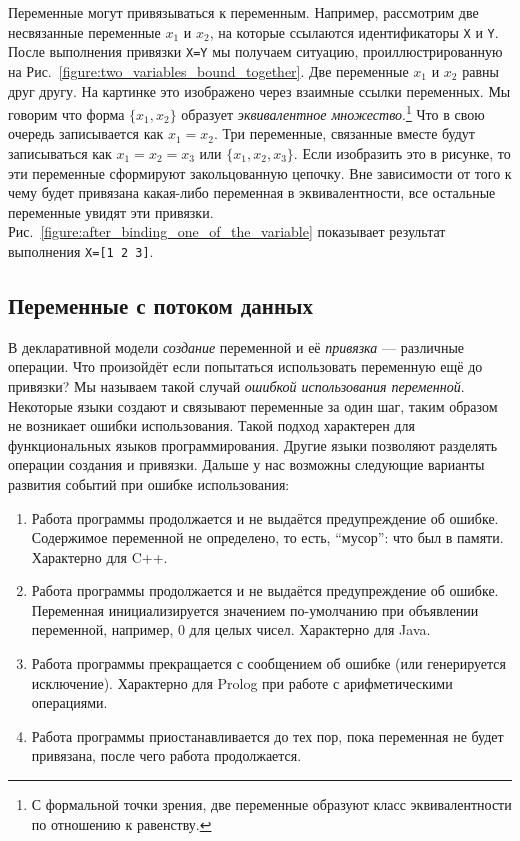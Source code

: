 Переменные могут привязываться к переменным. Например, рассмотрим две несвязанные переменные $x_{1}$ и $x_{2}$, на которые ссылаются идентификаторы \lstinline|X| и \lstinline|Y|. После выполнения привязки \lstinline|X=Y| мы получаем ситуацию, проиллюстрированную на Рис.~\ref{figure:two_variables_bound_together}. Две переменные $x_{1}$ и $x_{2}$ равны друг другу. На картинке это изображено через взаимные ссылки переменных. Мы говорим что форма $\{x_{1}, x_{2}\}$ образует \emph{эквивалентное множество}.\footnote{С формальной точки зрения, две переменные образуют класс эквивалентности по отношению к равенству.} Что в свою очередь записывается как $x_{1}=x_{2}$. Три переменные, связанные вместе будут записываться как $x_{1}=x_{2}=x_{3}$ или $\{x_{1}, x_{2}, x_{3}\}$. Если изобразить это в рисунке, то эти переменные сформируют закольцованную цепочку. Вне зависимости от того к чему будет привязана какая-либо переменная в эквивалентности, все остальные переменные увидят эти привязки. Рис.~\ref{figure:after_binding_one_of_the_variable} показывает результат выполнения \lstinline|X=[1 2 3]|.

\subsection{Переменные с потоком данных}

В декларативной модели \emph{создание} переменной и её \emph{привязка} --- различные операции. Что произойдёт если попытаться использовать переменную ещё до привязки? Мы называем такой случай \emph{ошибкой использования переменной}. Некоторые языки создают и связывают переменные за один шаг, таким образом не возникает ошибки использования. Такой подход характерен для функциональных языков программирования. Другие языки позволяют разделять операции создания и привязки. Дальше у нас возможны следующие варианты развития событий при ошибке использования:

\begin{enumerate}
  
\item{Работа программы продолжается и не выдаётся предупреждение об ошибке. Содержимое переменной не определено, то есть, ``мусор'': что был в памяти. Характерно для C++.}

\item{Работа программы продолжается и не выдаётся предупреждение об ошибке. Переменная инициализируется значением по-умолчанию при объявлении переменной, например, 0 для целых чисел. Характерно для Java.}

\item{Работа программы прекращается с сообщением об ошибке (или генерируется исключение). Характерно для Prolog при работе с арифметическими операциями.}

\item{Работа программы приостанавливается до тех пор, пока переменная не будет привязана, после чего работа продолжается.}
\end{enumerate}

